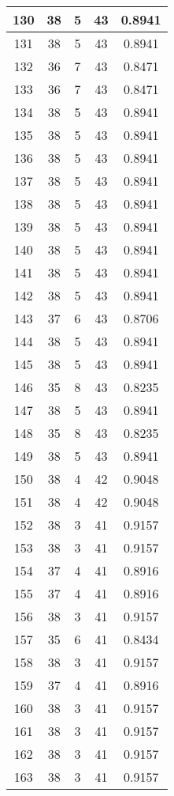 \documentclass[letterpaper, 12pt]{article}
\begin{document}
\begin{longtable}{|c|c|c|c|c|}
\hline
130 & 38 & 5 & 43 & 0.8941 \\
\hline
131 & 38 & 5 & 43 & 0.8941 \\
\hline
132 & 36 & 7 & 43 & 0.8471 \\
\hline
133 & 36 & 7 & 43 & 0.8471 \\
\hline
134 & 38 & 5 & 43 & 0.8941 \\
\hline
135 & 38 & 5 & 43 & 0.8941 \\
\hline
136 & 38 & 5 & 43 & 0.8941 \\
\hline
137 & 38 & 5 & 43 & 0.8941 \\
\hline
138 & 38 & 5 & 43 & 0.8941 \\
\hline
139 & 38 & 5 & 43 & 0.8941 \\
\hline
140 & 38 & 5 & 43 & 0.8941 \\
\hline
141 & 38 & 5 & 43 & 0.8941 \\
\hline
142 & 38 & 5 & 43 & 0.8941 \\
\hline
143 & 37 & 6 & 43 & 0.8706 \\
\hline
144 & 38 & 5 & 43 & 0.8941 \\
\hline
145 & 38 & 5 & 43 & 0.8941 \\
\hline
146 & 35 & 8 & 43 & 0.8235 \\
\hline
147 & 38 & 5 & 43 & 0.8941 \\
\hline
148 & 35 & 8 & 43 & 0.8235 \\
\hline
149 & 38 & 5 & 43 & 0.8941 \\
\hline
150 & 38 & 4 & 42 & 0.9048 \\
\hline
151 & 38 & 4 & 42 & 0.9048 \\
\hline
152 & 38 & 3 & 41 & 0.9157 \\
\hline
153 & 38 & 3 & 41 & 0.9157 \\
\hline
154 & 37 & 4 & 41 & 0.8916 \\
\hline
155 & 37 & 4 & 41 & 0.8916 \\
\hline
156 & 38 & 3 & 41 & 0.9157 \\
\hline
157 & 35 & 6 & 41 & 0.8434 \\
\hline
158 & 38 & 3 & 41 & 0.9157 \\
\hline
159 & 37 & 4 & 41 & 0.8916 \\
\hline
160 & 38 & 3 & 41 & 0.9157 \\
\hline
161 & 38 & 3 & 41 & 0.9157 \\
\hline
162 & 38 & 3 & 41 & 0.9157 \\
\hline
163 & 38 & 3 & 41 & 0.9157 \\

\end{longtable}
\end{document}
